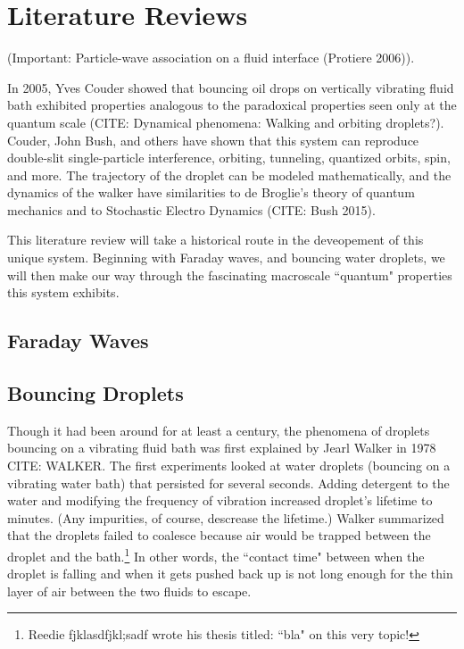 	\section{Literature Reviews}
	
(Important: Particle-wave association on a fluid interface (Protiere 2006)).
	    
	    In 2005, Yves Couder showed that bouncing oil drops on vertically vibrating fluid bath exhibited properties analogous to the paradoxical properties seen only at the quantum scale (CITE: Dynamical phenomena:  Walking and orbiting droplets?). Couder, John Bush, and others have shown that this system can reproduce double-slit single-particle interference, orbiting, tunneling, quantized orbits, spin, and more. The trajectory of the droplet can be modeled mathematically, and the dynamics of the walker have similarities to de Broglie's theory of quantum mechanics and to  Stochastic Electro Dynamics (CITE: Bush 2015).
	    
	    This literature review will take a historical route in the deveopement of this unique system. Beginning with Faraday waves, and bouncing water droplets, we will then make our way through the fascinating macroscale ``quantum" properties this system exhibits. 	       
	    \subsection{Faraday Waves}
	    
	    
	

	    
	    \subsection{Bouncing Droplets}
	    Though it had been around for at least a century, the phenomena of droplets bouncing on a vibrating fluid bath was first explained by Jearl Walker in 1978 CITE: WALKER. The first experiments looked at water droplets (bouncing on a vibrating water bath) that persisted for several seconds. Adding detergent to the water and modifying the frequency of vibration increased droplet's lifetime to minutes. (Any impurities, of course, descrease the lifetime.) Walker summarized that the droplets failed to coalesce because air would be trapped between the droplet and the bath.\footnote{Reedie fjklasdfjkl;sadf wrote his thesis titled: ``bla" on this very topic! } In other words, the ``contact time" between when the droplet is falling and when it gets pushed back up is not long enough for the thin layer of air between the two fluids to escape. 
	    
